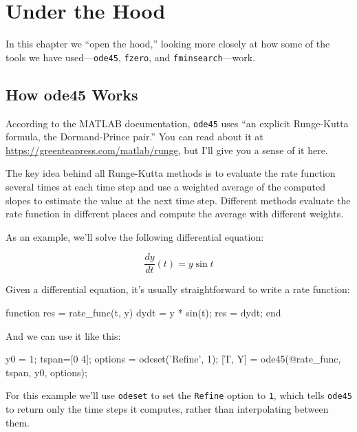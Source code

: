 \chapter{Under the Hood}
\label{how}


In this chapter we ``open the hood,'' looking more closely at how some of the tools we have used---\lstinline{ode45}, \lstinline{fzero}, and \lstinline{fminsearch}---work.


\section{How ode45 Works}
\label{howode45}

According to the MATLAB documentation, \lstinline{ode45} uses ``an explicit Runge-Kutta formula, the Dormand-Prince pair.''  You can read about it at  \url{https://greenteapress.com/matlab/runge}, but I'll give you a sense of it here.


The key idea behind all Runge-Kutta methods is to evaluate the rate function several times at each time step and use a weighted average of the computed slopes to estimate the value at the next time step.
Different methods evaluate the rate function in different places and compute the average with different weights.


As an example, we'll solve the following differential equation:

\[ \frac{dy}{dt}(t) = y \sin t \]

Given a differential equation, it's usually straightforward to write a rate function:

\begin{code}
function res = rate_func(t, y)
    dydt = y * sin(t);
    res = dydt;
end
\end{code}

And we can use it like this:

\begin{code}
    y0 = 1;
    tspan=[0 4];
    options = odeset('Refine', 1);
    [T, Y] = ode45(@rate_func, tspan, y0, options);
\end{code}

For this example we'll use \lstinline{odeset} to set the \lstinline{Refine} option to \lstinline{1}, which tells \lstinline{ode45} to return only the time steps it computes, rather than interpolating between them.

